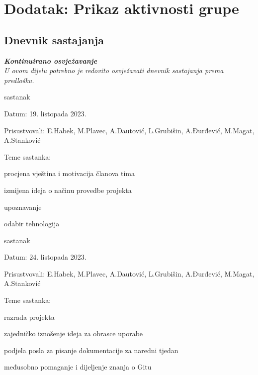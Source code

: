 \chapter*{Dodatak: Prikaz aktivnosti grupe}
		
		\section*{Dnevnik sastajanja}
		
		\textbf{\textit{Kontinuirano osvježavanje}}\\
		
		 \textit{U ovom dijelu potrebno je redovito osvježavati dnevnik sastajanja prema predlošku.}
		
		\begin{packed_enum}
			\item  sastanak
			
			\item[] \begin{packed_item}
				\item Datum: 19. listopada 2023.
				\item Prisustvovali: E.Habek, M.Plavec, A.Dautović, L.Grubišin, A.Đurđević, M.Magat, A.Stanković
				\item Teme sastanka:
				\begin{packed_item}
					\item procjena vještina i motivacija članova tima
					\item izmijena ideja o načinu provedbe projekta
					\item upoznavanje
					\item odabir tehnologija
				\end{packed_item}
			\end{packed_item}
			
			\item  sastanak
			\item[] \begin{packed_item}
				\item Datum: 24. listopada 2023.
				\item Prisustvovali: E.Habek, M.Plavec, A.Dautović, L.Grubišin, A.Đurđević, M.Magat, A.Stanković
				\item Teme sastanka:
				\begin{packed_item}
					\item razrada projekta
					\item zajedničko iznošenje ideja za obrasce uporabe
					\item podjela posla za pisanje dokumentacije za naredni tjedan
					\item međusobno pomaganje i dijeljenje znanja o Gitu
				\end{packed_item}
			\end{packed_item}
			

\end{packed_enum}
